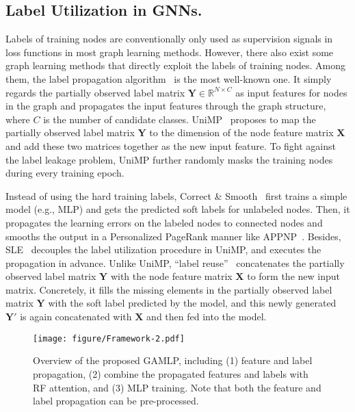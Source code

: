 \documentclass[sigconf]{acmart}
\begin{document}
\subsection{Label Utilization in GNNs.}
Labels of training nodes are conventionally only used as supervision signals in loss functions in most graph learning methods.
However, there also exist some graph learning methods that directly exploit the labels of training nodes.
Among them, the label propagation algorithm~\citep{zhu2002learnin} is the most well-known one.
It simply regards the partially observed label matrix $\mathbf{Y} \in \mathbb{R}^{N \times C}$ as input features for nodes in the graph and propagates the input features through the graph structure, where $C$ is the number of candidate classes.
UniMP~\citep{shi2020masked} proposes to map the partially observed label matrix $\mathbf{Y}$ to the dimension of the node feature matrix $\mathbf{X}$ and add these two matrices together as the new input feature.
To fight against the label leakage problem, UniMP further randomly masks the training nodes during every training epoch.

Instead of using the hard training labels, Correct \& Smooth~\citep{huang2020combining} first trains a simple model (e.g., MLP) and gets the predicted soft labels for unlabeled nodes. Then, it propagates the learning errors on the labeled nodes to connected nodes and smooths the output in a Personalized PageRank manner like APPNP~\citep{DBLP:conf/iclr/KlicperaBG19}. 
Besides, SLE~\citep{sun2021scalable} decouples the label utilization procedure in UniMP, and executes the propagation in advance. 
Unlike UniMP, ``label reuse''~\citep{wang2021bag}  concatenates the partially observed label matrix $\mathbf{Y}$ with the node feature matrix $\mathbf{X}$ to form the new input matrix.
Concretely, it fills the missing elements in the partially observed label matrix $\mathbf{Y}$ with the soft label predicted by the model, and this newly generated $\mathbf{Y}'$ is again concatenated with $\mathbf{X}$ and then fed into the model.

\begin{figure*}[tpb]
    \centering
    \hspace{22.5mm}
    \texttt{[image: figure/Framework-2.pdf]}
    \vspace{-2mm}
    \caption{Overview of the proposed GAMLP, including (1) feature and label propagation, (2) combine the propagated features and labels with RF attention, and (3) MLP training. Note that both the feature and label propagation can be pre-processed.
}  
     \vspace{-2mm}
    \label{Fig.pipe}
\end{figure*}
\end{document}
